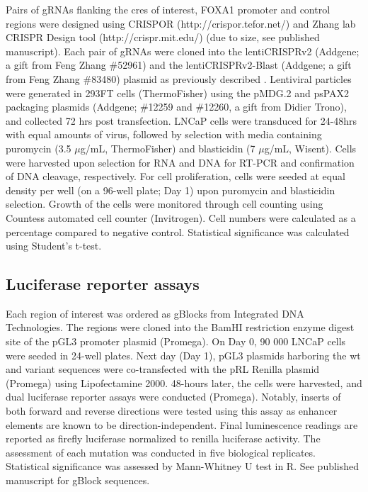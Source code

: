 Pairs of gRNAs flanking the \glspl{cre} of interest, FOXA1 promoter and control regions were designed using CRISPOR (http://crispor.tefor.net/) and Zhang lab CRISPR Design tool (http://crispr.mit.edu/) (due to size, see published manuscript).
Each pair of gRNAs were cloned into the lentiCRISPRv2 (Addgene; a gift from Feng Zhang \#52961) and the lentiCRISPRv2-Blast (Addgene; a gift from Feng Zhang \#83480) plasmid as previously described \cite{sanjanaImprovedVectorsGenomewide2014}.
Lentiviral particles were generated in 293FT cells (ThermoFisher) using the pMDG.2 and psPAX2 packaging plasmids (Addgene; \#12259 and \#12260, a gift from Didier Trono), and collected 72 hrs post transfection.
LNCaP cells were transduced for 24-48hrs with equal amounts of virus, followed by selection with media containing puromycin (3.5 $\mu$g/mL, ThermoFisher) and blasticidin (7 $\mu$g/mL, Wisent).
Cells were harvested upon selection for RNA and DNA for RT-PCR and confirmation of DNA cleavage, respectively.
For cell proliferation, cells were seeded at equal density per well (on a 96-well plate; Day 1) upon puromycin and blasticidin selection.
Growth of the cells were monitored through cell counting using Countess \texttrademark automated cell counter (Invitrogen).
Cell numbers were calculated as a percentage compared to negative control.
Statistical significance was calculated using Student's t-test.

\subsection{Luciferase reporter assays}

Each region of interest was ordered as gBlocks from Integrated DNA Technologies.
The regions were cloned into the BamHI restriction enzyme digest site of the pGL3 promoter plasmid (Promega).
On Day 0, 90 000 LNCaP cells were seeded in 24-well plates.
Next day (Day 1), pGL3 plasmids harboring the \gls{wt} and variant sequences were co-transfected with the pRL Renilla plasmid (Promega) using Lipofectamine 2000.
48-hours later, the cells were harvested, and dual luciferase reporter assays were conducted (Promega).
Notably, inserts of both forward and reverse directions were tested using this assay as enhancer elements are known to be direction-independent.
Final luminescence readings are reported as firefly luciferase normalized to renilla luciferase activity.
The assessment of each mutation was conducted in five biological replicates.
Statistical significance was assessed by Mann-Whitney U test in R.
See published manuscript for gBlock sequences.

